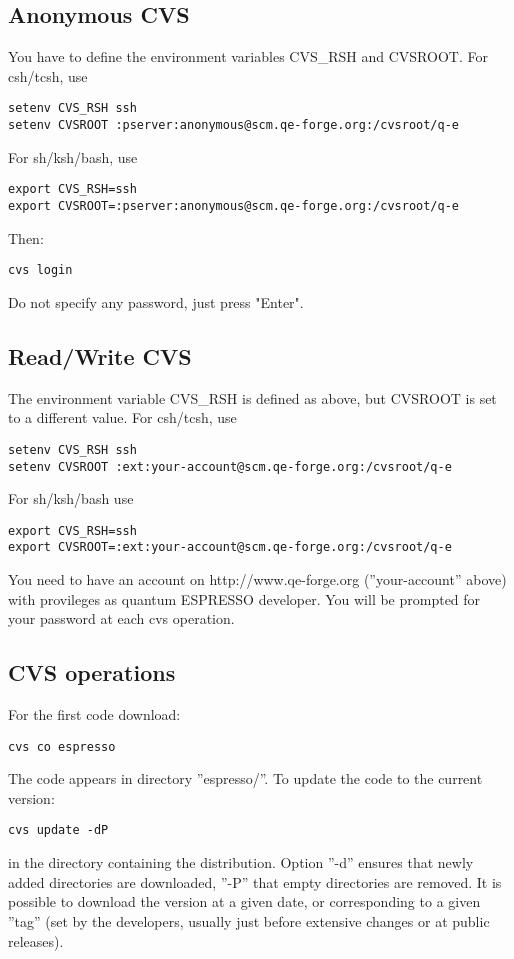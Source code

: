 \documentclass[12pt,a4paper]{article}
\begin{document}
\subsection{Anonymous CVS}

You have to define the environment variables CVS\_RSH and CVSROOT.
For csh/tcsh, use
\begin{verbatim}
setenv CVS_RSH ssh
setenv CVSROOT :pserver:anonymous@scm.qe-forge.org:/cvsroot/q-e
\end{verbatim}
For sh/ksh/bash, use
\begin{verbatim}
export CVS_RSH=ssh
export CVSROOT=:pserver:anonymous@scm.qe-forge.org:/cvsroot/q-e 
\end{verbatim}
Then:
\begin{verbatim}
cvs login
\end{verbatim}
Do not specify any password, just press "Enter".

\subsection{Read/Write CVS}

The environment variable CVS\_RSH is defined as above, but CVSROOT is
set to a different value. For csh/tcsh, use
\begin{verbatim}
setenv CVS_RSH ssh
setenv CVSROOT :ext:your-account@scm.qe-forge.org:/cvsroot/q-e 
\end{verbatim}
For sh/ksh/bash use
\begin{verbatim}
export CVS_RSH=ssh
export CVSROOT=:ext:your-account@scm.qe-forge.org:/cvsroot/q-e 
\end{verbatim}
You need to have an account on http://www.qe-forge.org (''your-account'' above) 
with provileges as quantum ESPRESSO developer.
You will be prompted for your password at each cvs operation.

\subsection{CVS operations}

For the first code download:
\begin{verbatim}
cvs co espresso
\end{verbatim}
The code appears in directory ''espresso/''. To update the code to the current version:
\begin{verbatim}
cvs update -dP
\end{verbatim}
in the directory containing the distribution. Option ''-d'' ensures that newly added
directories are downloaded, ''-P'' that empty directories are removed. 
It is possible to download the version at a given date, or corresponding to  a given ''tag'' 
(set by the developers, usually just before extensive changes or at public releases).
\end{document}

